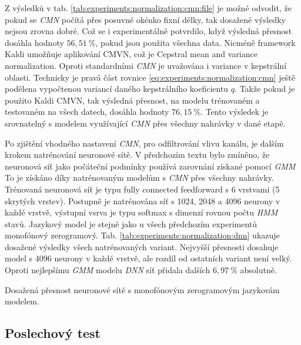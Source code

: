 Z výsledků v tab. \ref{tab:experiments:normalization:cmn:file} je možné odvodit, že pokud se \textit{CMN}  počítá přes posuvné okénko fixní délky, tak dosažené výsledky nejsou zrovna dobré. Což se i experimentálně potvrdilo, když výsledná přesnost dosáhla hodnoty $56,51\ \%$, pokud jsou použita všechna data. Nicméně framework Kaldi umožňuje aplikování CMVN, což je Cepstral mean and variance normalization. Oproti standardními \textit{CMN}  je uvažována i variance v kepstrální oblasti. Technicky je pravá část rovnice \ref{eq:experiments:normalization:cmn} ještě podělena vypočtenou variancí daného kepstrálního koeficientu $q$. Takže pokud je použito Kaldi CMVN, tak výsledná přesnost, na modelu trénovaném a testovaném na všech datech, dosáhla hodnoty $76,15\ \%$. Tento výsledek je srovnatelný s modelem využívající \textit{CMN}  přes všechny nahrávky v dané etapě.

Po zjištění vhodného nastavení \textit{CMN},  pro odfiltrování vlivu kanálu, je dalším krokem natrénování neuronové sítě. V předchozím textu bylo zmíněno, že neuronová síť jako počáteční podmínky používá zarovnání získané pomocí \textit{GMM}  To je získáno díky natrénovaným modelům s \textit{CMN}  přes všechny nahrávky. Trénovaná neuronová síť je typu fully connected feedforward s 6 vrstvami (5 skrytých vrstev). Postupně je natrénována síť s 1024, 2048 a 4096 neurony v každé vrstvě, výstupní vsrva je typu softmax s dimenzí rovnou počtu \textit{HMM} stavů. Jazykový model je stejně jako u všech předchozím experimentů monofónový zerogramový. Tab. \ref{tab:experiments:normalization:dnn} ukazuje dosažené výsledky všech natrénovaných variant. Nejvyšší přesnosti dosahuje model s 4096 neurony v každé vrstvě, ale rozdíl od ostatních variant není velký. Oproti nejlepšímu \textit{GMM} modelu \textit{DNN} síť přidala dalších $6,97\ \%$ absolutně.

\begin{table}[htpb]
  \centering
  \def\arraystretch{1.5}
  \caption{Dosažená přesnost neuronové sítě s monofónovým zerogramovým jazykovám modelem.}
  \label{tab:experiments:normalization:dnn}
\end{table}

\subsection{Poslechový test}
\label{chap:realisation:test:listening}

